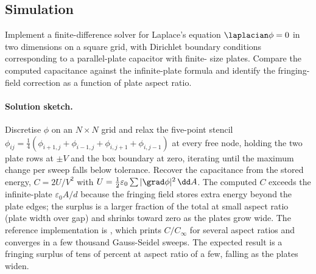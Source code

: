 \subsection*{Simulation}

\begin{exercise}
Implement a finite-difference solver for Laplace's equation $\laplacian
\phi = 0$ in two dimensions on a square grid, with Dirichlet boundary
conditions corresponding to a parallel-plate capacitor with finite-
size plates. Compare the computed capacitance against the
infinite-plate formula and identify the fringing-field correction as
a function of plate aspect ratio.

\paragraph{Solution sketch.} Discretise $\phi$ on an $N\times N$ grid and
relax the five-point stencil $\phi_{ij} = \tfrac14(\phi_{i+1,j} +
\phi_{i-1,j} + \phi_{i,j+1} + \phi_{i,j-1})$ at every free node, holding
the two plate rows at $\pm V$ and the box boundary at zero, iterating
until the maximum change per sweep falls below tolerance. Recover the
capacitance from the stored energy, $C = 2U/V^2$ with $U = \tfrac12
\varepsilon_0\sum|\grad\phi|^2\,\dd A$. The computed $C$ exceeds the
infinite-plate $\varepsilon_0 A/d$ because the fringing field stores
extra energy beyond the plate edges; the surplus is a larger fraction
of the total at small aspect ratio (plate width over gap) and shrinks
toward zero as the plates grow wide. The reference implementation is
, which prints $C/C_{\infty}$ for
several aspect ratios and converges in a few thousand Gauss-Seidel
sweeps. The expected result is a fringing surplus of tens of percent at
aspect ratio of a few, falling as the plates widen.
\end{exercise}

